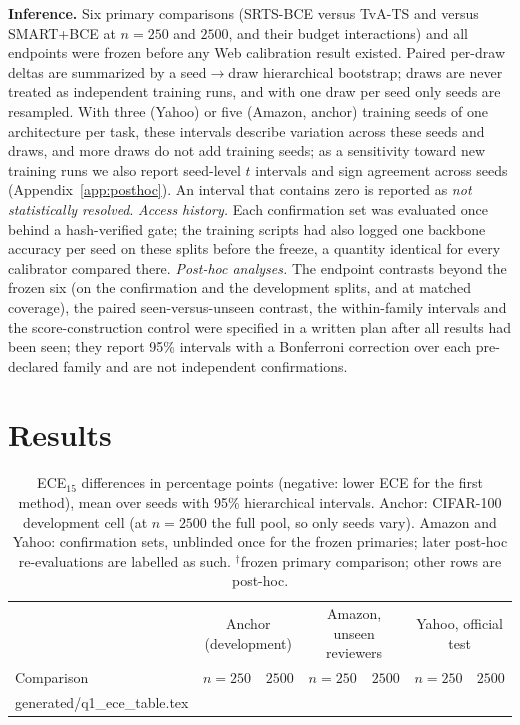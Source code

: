 \documentclass[sigconf,anonymous,review]{acmart}
\makeatletter
\newcommand{\tablerows}[1]{\@@input #1.tex }
\makeatother
\begin{document}
\textbf{Inference.} Six primary comparisons (SRTS-BCE versus TvA-TS and
versus SMART+BCE at $n{=}250$ and $2500$, and their budget interactions)
and all endpoints were frozen before any Web calibration result existed.
Paired per-draw deltas are summarized by a seed$\to$draw hierarchical
bootstrap; draws are never treated as independent training runs, and with
one draw per seed only seeds are resampled. With three (Yahoo) or five
(Amazon, anchor) training seeds of one architecture per task, these
intervals describe variation across these seeds and draws, and more draws
do not add training seeds; as a sensitivity toward new training runs we
also report seed-level $t$ intervals and sign agreement across seeds (Appendix~\ref{app:posthoc}). An interval that contains zero is
reported as \emph{not statistically resolved}. \emph{Access history.}
Each confirmation set was evaluated once behind a hash-verified gate; the
training scripts had also logged one backbone accuracy per seed on these
splits before the freeze, a quantity identical for every calibrator
compared there. \emph{Post-hoc analyses.} The endpoint contrasts beyond the frozen six
(on the confirmation and the development splits, and at matched coverage),
the paired seen-versus-unseen contrast, the within-family intervals and the
score-construction control were
specified in a written plan after all results had been seen; they report 95\% intervals with a Bonferroni correction over each
pre-declared family and are not independent confirmations.

\section{Results}
\label{sec:results}

\begin{table}
\centering\footnotesize
\setlength{\tabcolsep}{3pt}
\caption{ECE$_{15}$ differences in percentage points (negative: lower ECE
for the first method), mean over seeds with 95\% hierarchical intervals. Anchor:
CIFAR-100 development cell (at $n{=}2500$ the full pool, so only seeds
vary). Amazon and Yahoo: confirmation sets, unblinded once for the frozen
primaries; later post-hoc re-evaluations are labelled as such.
$^\dagger$frozen
primary comparison; other rows are post-hoc.}
\label{tab:q1}
\begin{tabular}{lcccccc}
\toprule
& \multicolumn{2}{c}{Anchor (development)} & \multicolumn{2}{c}{Amazon,
unseen reviewers} & \multicolumn{2}{c}{Yahoo, official test}\\
\cmidrule(lr){2-3}\cmidrule(lr){4-5}\cmidrule(lr){6-7}
Comparison & $n{=}250$ & $2500$ & $n{=}250$ & $2500$ & $n{=}250$ & $2500$\\
\midrule
\tablerows{generated/q1_ece_table}
\bottomrule
\end{tabular}
\end{table}
\end{document}
